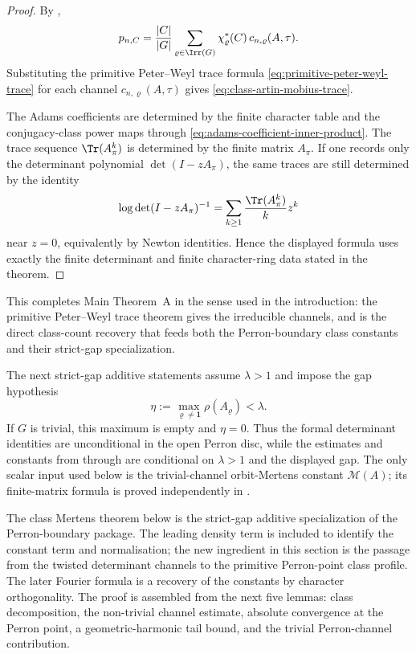 \begin{proof}
  By ,
  \[
    p_{n,C}
    =
    \frac{|C|}{|G|}
      \sum_{\varrho\in\Irr(G)}
        \chi_\varrho^\ast(C)\,c_{n,\varrho}(A,\tau).
  \]
  Substituting the primitive Peter--Weyl trace formula
  \eqref{eq:primitive-peter-weyl-trace} for each channel
  \(c_{n,\varrho}(A,\tau)\) gives
  \eqref{eq:class-artin-mobius-trace}.

  The Adams coefficients are determined by the finite character table and
  the conjugacy-class power maps through
  \eqref{eq:adams-coefficient-inner-product}. The trace sequence
  \(\Tr(A_\pi^k)\) is determined by the finite matrix \(A_\pi\). If one
  records only the determinant polynomial \(\det(I-zA_\pi)\), the same
  traces are still determined by the identity
  \[
    \log\det(I-zA_\pi)^{-1}
    =
    \sum_{k\ge1}\frac{\Tr(A_\pi^k)}{k}z^k
  \]
  near \(z=0\), equivalently by Newton identities. Hence the displayed
  formula uses exactly the finite determinant and finite character-ring
  data stated in the theorem.
\end{proof}

\noindent
This completes Main Theorem~A in the sense used in the introduction:
the primitive Peter--Weyl trace theorem gives the irreducible channels,
and  is the direct class-count
recovery that feeds both the Perron-boundary class constants and their
strict-gap specialization.

The next strict-gap additive statements assume \(\lambda>1\) and impose the
gap hypothesis
\[
  \eta:=\max_{\varrho\neq\mathbf 1}\rho(A_\varrho)<\lambda.
\]
If \(G\) is trivial, this maximum is empty and \(\eta=0\).
Thus the formal determinant identities
are unconditional in the open Perron disc, while the estimates and
constants from  through
 are conditional on \(\lambda>1\) and
the displayed gap.
The only scalar input used below is the trivial-channel
orbit-Mertens constant \(\mathcal M(A)\); its finite-matrix formula is
proved independently in .

The class Mertens theorem below is the strict-gap additive specialization of
the Perron-boundary package. The leading density term is included
to identify the constant term and normalisation; the new ingredient in
this section is the passage from the twisted determinant channels to the
primitive Perron-point class profile. The later Fourier formula is a
recovery of the constants by character orthogonality. The proof is
assembled from the next five lemmas:
class decomposition, the non-trivial channel estimate, absolute
convergence at the Perron point, a geometric-harmonic tail bound, and
the trivial Perron-channel contribution.

